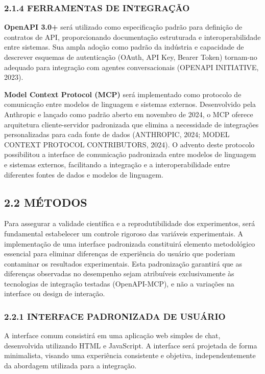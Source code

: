 \documentclass[
]{article}
\begin{document}
\subsubsection{2.1.4 FERRAMENTAS DE
INTEGRAÇÃO}\label{ferramentas-de-integrauxe7uxe3o}

\textbf{OpenAPI 3.0+} será utilizado como especificação padrão para
definição de contratos de API, proporcionando documentação estruturada e
interoperabilidade entre sistemas. Sua ampla adoção como padrão da
indústria e capacidade de descrever esquemas de autenticação (OAuth, API
Key, Bearer Token) tornam-no adequado para integração com agentes
conversacionais (OPENAPI INITIATIVE, 2023).

\textbf{Model Context Protocol (MCP)} será implementado como protocolo
de comunicação entre modelos de linguagem e sistemas externos.
Desenvolvido pela Anthropic e lançado como padrão aberto em novembro de
2024, o MCP oferece arquitetura cliente-servidor padronizada que elimina
a necessidade de integrações personalizadas para cada fonte de dados
(ANTHROPIC, 2024; MODEL CONTEXT PROTOCOL CONTRIBUTORS, 2024). O advento
deste protocolo possibilitou a interface de comunicação padronizada
entre modelos de linguagem e sistemas externos, facilitando a integração
e a interoperabilidade entre diferentes fontes de dados e modelos de
linguagem.

\subsection{2.2 MÉTODOS}\label{muxe9todos}

Para assegurar a validade científica e a reprodutibilidade dos
experimentos, será fundamental estabelecer um controle rigoroso das
variáveis experimentais. A implementação de uma interface padronizada
constituirá elemento metodológico essencial para eliminar diferenças de
experiência do usuário que poderiam contaminar os resultados
experimentais. Esta padronização garantirá que as diferenças observadas
no desempenho sejam atribuíveis exclusivamente às tecnologias de
integração testadas (OpenAPI-MCP), e não a variações na interface ou
design de interação.

\subsubsection{2.2.1 INTERFACE PADRONIZADA DE
USUÁRIO}\label{interface-padronizada-de-usuuxe1rio}

A interface comum consistirá em uma aplicação web simples de chat,
desenvolvida utilizando HTML e JavaScript. A interface será projetada de
forma minimalista, visando uma experiência consistente e objetiva,
independentemente da abordagem utilizada para a integração.
\end{document}
